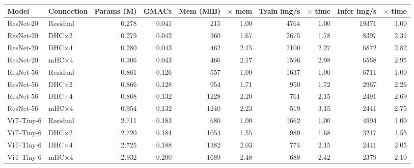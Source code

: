 \begin{tabular}{llrrrrrrrr}
\toprule
Model & Connection & Params (M) & GMACs & Mem (MiB) & $\times$ mem & Train img/s & $\times$ time & Infer img/s & $\times$ time \\
\midrule
ResNet-20 & Residual & 0.278 & 0.041 & 215 & 1.00 & 4764 & 1.00 & 19371 & 1.00 \\
ResNet-20 & DHC$\times$2 & 0.279 & 0.042 & 360 & 1.67 & 2675 & 1.78 & 8397 & 2.31 \\
ResNet-20 & DHC$\times$4 & 0.280 & 0.043 & 462 & 2.15 & 2100 & 2.27 & 6872 & 2.82 \\
ResNet-20 & mHC$\times$4 & 0.306 & 0.043 & 466 & 2.17 & 1596 & 2.98 & 6568 & 2.95 \\
ResNet-56 & Residual & 0.861 & 0.126 & 557 & 1.00 & 1637 & 1.00 & 6711 & 1.00 \\
ResNet-56 & DHC$\times$2 & 0.866 & 0.128 & 954 & 1.71 & 950 & 1.72 & 2967 & 2.26 \\
ResNet-56 & DHC$\times$4 & 0.868 & 0.132 & 1228 & 2.20 & 761 & 2.15 & 2491 & 2.69 \\
ResNet-56 & mHC$\times$4 & 0.954 & 0.132 & 1240 & 2.23 & 519 & 3.15 & 2441 & 2.75 \\
ViT-Tiny-6 & Residual & 2.711 & 0.183 & 680 & 1.00 & 1662 & 1.00 & 4994 & 1.00 \\
ViT-Tiny-6 & DHC$\times$2 & 2.720 & 0.184 & 1054 & 1.55 & 989 & 1.68 & 3217 & 1.55 \\
ViT-Tiny-6 & DHC$\times$4 & 2.725 & 0.188 & 1382 & 2.03 & 774 & 2.15 & 2441 & 2.05 \\
ViT-Tiny-6 & mHC$\times$4 & 2.932 & 0.200 & 1689 & 2.48 & 688 & 2.42 & 2379 & 2.10 \\
\bottomrule
\end{tabular}
